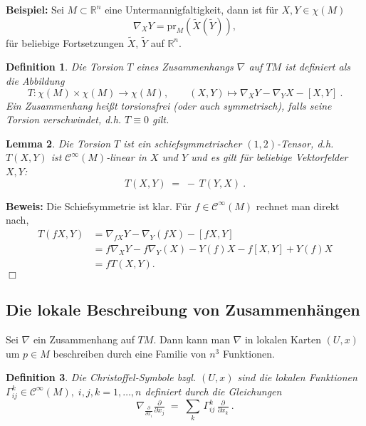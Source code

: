\documentclass[12pt,a4paper]{article}
\def\R{\mathbb{R}}
\def\pr{\mathrm{pr}}
\newtheorem{Lemma}{Lemma}[section]
\newtheorem{Definition}[Lemma]{Definition}
\def\proof{\noindent\textbf{Beweis:}\quad}
\def\qed{\quad\hfill\ensuremath{\Box}}
\begin{document}
\bigskip


{\bf Beispiel:}
Sei $M\subset\R^n$ eine Untermannigfaltigkeit, dann ist f\"ur $X,Y\in\chi(M)$
$$
\nabla_X Y = \pr_M(\tilde{X}(\tilde{Y})),
$$
f\"ur beliebige Fortsetzungen $\tilde{X}$, $\tilde{Y}$ auf $\R^n$.

\bigskip

\begin{Definition}
Die {\em Torsion} $T$  eines Zusammenhangs $\nabla$ auf $TM$ ist definiert als
die Abbildung $$
T: \chi(M) \times \chi(M) \rightarrow \chi(M), \qquad (X, Y) \mapsto \nabla_XY - \nabla_YX - [X,Y] \ .
$$
Ein Zusammenhang hei\ss t {\em torsionsfrei} (oder auch symmetrisch), falls seine Torsion 
verschwindet, d.h. $T \equiv 0$  gilt.
\end{Definition}



\bigskip

\begin{Lemma}
Die Torsion $T$ ist ein schiefsymmetrischer $(1,2)$-Tensor, d.h. $T(X,Y)$ ist 
$\mathcal C^\infty (M)$-linear in $X$ und $Y$ und es gilt f\"ur beliebige 
Vektorfelder $X,Y$:
$$
T(X,Y) \;=\; - \, T(Y,X) \ .
$$
\end{Lemma}
\proof
Die Schiefsymmetrie ist klar. F\"ur $f\in \mathcal C^\infty(M)$ rechnet man
direkt nach,
\begin{align*}
T(f X,Y) &= \nabla_{fX} Y - \nabla_Y (fX) - [fX,Y]\\
&= f\nabla_XY - f\nabla_Y(X) - Y(f)X - f[X,Y] + Y(f)X\\
&= fT(X,Y).
\end{align*}
\qed

\bigskip

\subsection{Die lokale Beschreibung von Zusammenh\"angen}

\bigskip

Sei $\nabla$ ein Zusammenhang auf $TM$. Dann kann man $\nabla$ in lokalen
Karten $(U,x)$ um $p \in M$ beschreiben durch eine Familie von $n^3$ Funktionen.

\begin{Definition}
Die  {\em Christoffel-Symbole} bzgl. $(U,x)$ sind die lokalen Funktionen
$\Gamma^k_{ij} \in \mathcal C^\infty(M), \; i,j,k = 1,\ldots, n$ definiert
durch die Gleichungen
$$
\nabla_{ \tfrac{\partial }{\partial x_i} } \tfrac{\partial }{\partial x_j}
\;=\;
\sum_k \, \Gamma^k_{i j}\, \tfrac{\partial }{\partial x_k} \ .
$$
\end{Definition}
\end{document}
